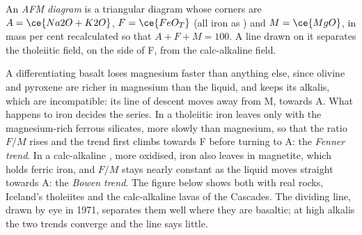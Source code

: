 \begin{definition}\label{def:b2:magmatic-series:afm}
An \emph{AFM diagram} is a triangular diagram whose corners are
$A = \ce{Na2O + K2O}$, $F = \ce{FeO_T}$ (all iron as ) and $M = \ce{MgO}$, in
mass per cent recalculated so that $A + F + M = 100$. A line drawn on it separates the
tholeiitic field, on the side of F, from the calc-alkaline field.
\end{definition}

A differentiating basalt loses magnesium faster than anything else, since olivine and
pyroxene are richer in magnesium than the liquid, and keeps its alkalis, which are
incompatible: its line of descent moves away from M, towards A. What happens to
iron decides the series. In a tholeiitic  iron leaves only with the
magnesium-rich ferrous silicates, more slowly than magnesium, so that the ratio
$F/M$ rises and the trend first climbs towards F before turning to A: the
\emph{Fenner trend}. In a calc-alkaline , more oxidised, iron also leaves in
magnetite, which holds ferric iron, and $F/M$ stays nearly constant as the liquid
moves straight towards A: the \emph{Bowen trend}. The figure below shows both with
real rocks, Iceland's tholeiites and the calc-alkaline lavas of the Cascades. The
dividing line, drawn by eye in 1971, separates them well where they are basaltic; at
high alkalis the two trends converge and the line says little.

